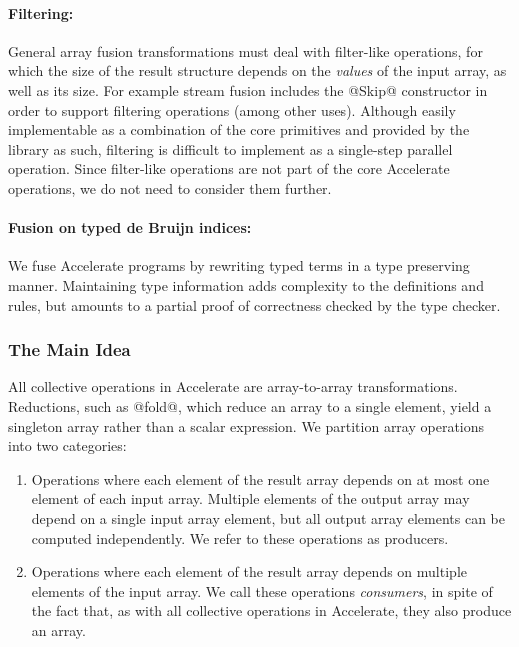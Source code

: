 \paragraph{Filtering:} General array fusion transformations must deal with
filter-like operations, for which the size of the result structure depends on
the \emph{values} of the input array, as well as its size. For example
stream fusion includes the @Skip@ constructor in
order to support filtering operations (among other uses). Although easily
implementable as a combination of the core primitives and provided by the
library as such, filtering is difficult to implement as a single-step parallel
operation. Since filter-like operations are not part of the core Accelerate
operations, we do not need to consider them further.

%

\paragraph{Fusion on typed de Bruijn indices:} We fuse Accelerate programs by
rewriting typed  terms in a type preserving manner.
Maintaining type information adds complexity to the definitions and rules, but
amounts to a partial proof of correctness checked by the type checker.


\subsubsection{The Main Idea}
\label{sec:the_main_idea}

All collective operations in Accelerate are array-to-array transformations.
Reductions, such as @fold@, which reduce an array to a single element,
yield a singleton array rather than a scalar expression. We partition array
operations into two categories:

\begin{enumerate}
    \item Operations where each element of the result array depends on at most
        one element of each input array. Multiple elements of the output array
        may depend on a single input array element, but all output array
        elements can be computed independently. We refer to these operations as
        producers.

    \item Operations where each element of the result array depends on multiple
        elements of the input array. We call these operations
        \emph{consumers}, in spite of the fact that, as with all
        collective operations in Accelerate, they also produce an array.
\end{enumerate}

